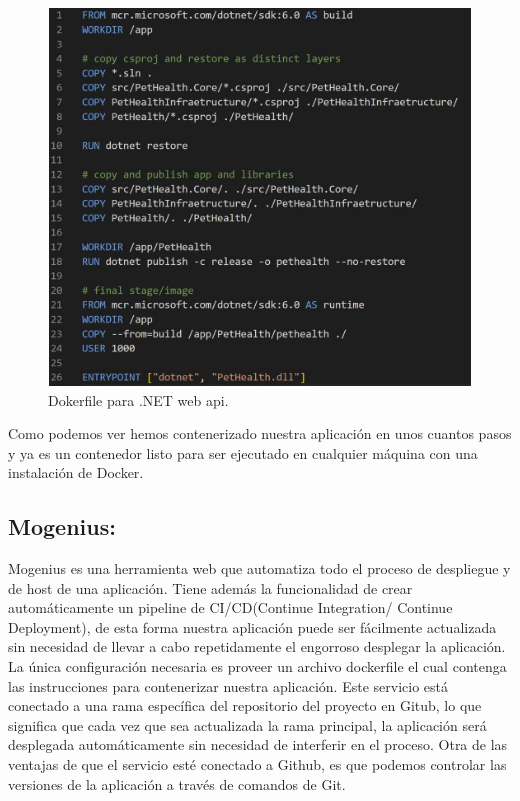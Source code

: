 \begin{figure}[H]
	\centering
	\includegraphics[width = 12cm, height=10cm]{Graphics/dokerfile.jpg}
	\caption{Dokerfile para .NET web api. }
	\label{fig:dockerfile}
\end{figure}

Como podemos ver hemos contenerizado nuestra aplicación en unos cuantos pasos y ya es un contenedor listo para ser ejecutado en cualquier máquina con una instalación de Docker.

\subsection{Mogenius:}

Mogenius es una herramienta web que automatiza todo el proceso de despliegue y de host de una aplicación. Tiene además la funcionalidad de crear automáticamente un pipeline de CI/CD(Continue Integration/ Continue Deployment), de esta forma nuestra aplicación puede ser fácilmente actualizada sin necesidad de llevar a cabo repetidamente el engorroso desplegar la aplicación. La única configuración necesaria es proveer un archivo dockerfile el cual contenga las instrucciones para contenerizar nuestra aplicación. Este servicio está conectado a una rama específica del repositorio del proyecto en Gitub, lo que significa que cada vez que sea actualizada la rama principal, la aplicación será desplegada automáticamente sin necesidad de interferir en el proceso. Otra de las ventajas de que el servicio esté conectado a Github, es que podemos controlar las versiones de la aplicación a través de comandos de Git.


